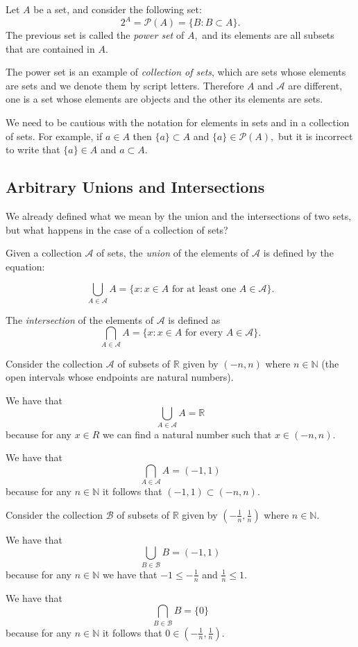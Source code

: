 \documentclass[
	fontsize=10pt, %
	twoside=false, %
	secnumdepth=1, %
]{kaobook}
\begin{document}
\begin{definition}
Let $A$ be a set, and consider the following set: $$2^A=\mathcal{P}(A)=\{B: B\subset A\}.$$ The previous set is called the \emph{power set} of $A,$ and its elements are all subsets that are contained in $A.$
\end{definition}

The power set is an example of \emph{collection of sets}, which are sets whose elements are sets and we denote them by script letters. Therefore $A$ and $\mathcal{A}$ are different, one is a set whose elements are objects and the other its elements are sets.

We need to be cautious with the notation for elements in sets and in a collection of sets. For example, if $a\in A$ then $\{a\}\subset A$ and $\{a\}\in \mathcal{P}(A),$ but it is incorrect to write that $\{a\}\in A$  and $a\subset A.$


\subsection{Arbitrary Unions and Intersections}

We already defined what we mean by the union and the intersections of two sets, but what happens in the case of a collection of sets? 

Given a collection $\mathcal{A}$ of sets, the \emph{union} of the elements of $\mathcal{A}$ is defined by the equation:

$$\bigcup_{A\in \mathcal{A}} A= \{x : x\in A\mbox{ for at least one }A\in \mathcal{A}\}.$$

The \emph{intersection} of the elements of $\mathcal{A}$ is defined as 
$$\bigcap_{A\in \mathcal{A}} A= \{x : x\in A\mbox{ for every }A\in \mathcal{A}\}.$$

\begin{example}
Consider the collection $\mathcal{A}$ of subsets of $\mathbb{R}$ given by $(-n,n)$ where $n\in\mathbb{N}$ (the open intervals whose endpoints are natural numbers). 

We have that $$\bigcup_{A\in\mathcal{A}}A =\mathbb{R}$$ because for any $x\in R$ we can find a natural number such that $x\in (-n,n).$

We have that $$\bigcap_{A\in\mathcal{A}} A= (-1,1)$$ because for any $n\in\mathbb{N}$ it follows that $(-1,1)\subset (-n,n).$
\end{example}

\begin{example}
Consider the collection $\mathcal{B}$ of subsets of $\mathbb{R}$ given by $\left(-\frac{1}{n},\frac{1}{n}\right)$ where $n\in\mathbb{N}.$

We have that $$\bigcup_{B\in\mathcal{B}}B =(-1,1)$$ because for any $n\in \mathbb{N}$ we have that $-1\leq -\frac{1}{n}$ and $\frac{1}{n}\leq 1.$

We have that $$\bigcap_{B\in\mathcal{B}} B= \{0\}$$ because for any $n\in\mathbb{N}$ it follows that $0\in \left(-\frac{1}{n},\frac{1}{n}\right).$
\end{example}
\end{document}
